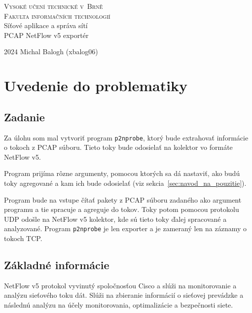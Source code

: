 \documentclass[a4paper, 12pt]{article}
\begin{document}
\begin{titlepage}
	\begin{center}
		{\Huge 
        \textsc{Vysoké učení technické v~Brně}\\[0.5em]}
		{\huge 
        \textsc{Fakulta informačních technologií}}\\
		{\Large 
        Síťové aplikace a správa sítí}\\[0.6em]
        {\LARGE PCAP NetFlow v5 exportér}
	\end{center}
	{\Large 2024 \hfill 
    Michal Balogh (xbalog06) }
\end{titlepage}

\tableofcontents

\newpage

\section{Uvedenie do problematiky}

\subsection{Zadanie}

Za úlohu som mal vytvoriť program \texttt{p2nprobe}, ktorý bude extrahovať informácie o tokoch z PCAP súboru. Tieto toky bude odosielať na kolektor vo formáte NetFlow v5.

Program prijíma rôzne argumenty, pomocou ktorých sa dá nastaviť, ako budú toky agregované a kam ich bude odosielať (viz sekcia~\ref{sec:navod_na_pouzitie}).

Program bude na vstupe čítať pakety z PCAP súboru zadaného ako argument programu a tie spracuje a agreguje do tokov. Toky potom pomocou protokolu UDP odošle na NetFlow v5 kolektor, kde sú tieto toky ďalej spracované a analyzované. Program \texttt{p2nprobe} je len exporter a je zameraný len na záznamy o tokoch TCP.

\subsection{Základné informácie}

NetFlow v5 protokol vyvinutý spoločnosťou Cisco a slúži na monitorovanie a analýzu sieťového toku dát. Slúži na zbieranie informácií o sieťovej prevádzke a následnú analýzu na účely monitorovania, optimalizácie a bezpečnosti siete.
\end{document}
